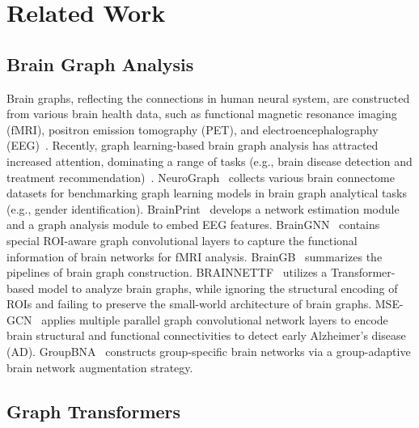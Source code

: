 \section{Related Work}
\subsection{Brain Graph Analysis}

Brain graphs, reflecting the connections in human neural system, are constructed from various brain health data, such as functional magnetic resonance imaging (fMRI), positron emission tomography (PET), and electroencephalography (EEG)~\citep{bullmore2009complex,bessadok2022graph}. Recently, graph learning-based brain graph analysis has attracted increased attention, dominating a range of tasks (e.g., brain disease detection and treatment recommendation)~\citep{10388338,kan2022brain,liu2023braintgl,ding2023lggnet}. NeuroGraph~\citep{said2024neurograph} collects various brain connectome datasets for benchmarking graph learning models in brain graph analytical tasks (e.g., gender identification). BrainPrint~\citep{wang2020brainprint} develops a network estimation module and a graph analysis module to embed EEG features. 
BrainGNN~\citep{li2021braingnn} contains special ROI-aware graph convolutional layers to capture the functional information of brain networks for fMRI analysis. %
BrainGB~\citep{cui2022braingb} summarizes the pipelines of brain graph construction. BRAINNETTF~\citep{kan2022brain} utilizes a Transformer-based model to analyze brain graphs, while ignoring the structural encoding of ROIs and failing to preserve the small-world architecture of brain graphs. MSE-GCN~\citep{lei2023multi} applies multiple parallel graph convolutional network layers to encode brain structural and functional connectivities to detect early Alzheimer’s disease (AD). GroupBNA~\citep{peng2024adaptive} constructs group-specific brain networks via a group-adaptive brain network augmentation strategy.


\subsection{Graph Transformers}


